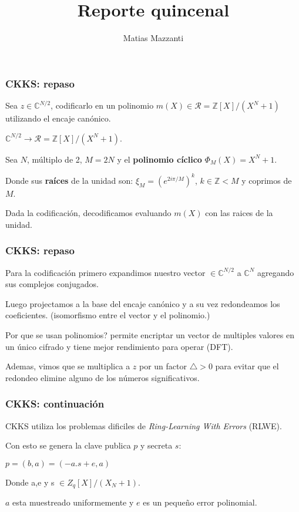 \documentclass[10pt]{beamer}
\title[Reporte quincenal]{Reporte quincenal}
\author[Matias Mazzanti]{Matias Mazzanti}
\begin{document}

\begin{frame}
\frametitle{CKKS: repaso}
Sea $z\in \mathbb{C}^{N/2}$, codificarlo en un polinomio  $m(X)\in \mathcal{R} = \mathbb{Z}[X]/(X^N+1)$
utilizando el encaje canónico.
\pause

$ \mathbb{C}^{N/2} \to \mathcal{R} =\mathbb{Z}[X]/(X^N+1)$.
\pause

Sea $N$, múltiplo de 2, $M=2N$ y el
 \textbf{polinomio cíclico} $\Phi_M(X)= X^N+1$.
\pause

Donde sus \textbf{raíces} de la unidad son: $\xi_M=(e^{2i\pi/M})^k$, $k\in \mathbb{Z}<M$ y coprimos de $M$.
\pause

Dada la codificación, decodificamos evaluando $m(X)$ con las raices de la unidad.

\end{frame}

\begin{frame}
\frametitle{CKKS: repaso}
Para la codificación primero expandimos nuestro vector $\in  \mathbb{C}^{N/2}$ a $ \mathbb{C}^{N}$
agregando sus complejos conjugados.
\pause

Luego projectamos a la base del encaje canónico y a su vez redondeamos los coeficientes.
(isomorfismo entre el vector y el polinomio.)
\pause

Por que se usan polinomios? \pause permite encriptar un vector de multiples valores en un único cifrado
y tiene mejor rendimiento para operar (DFT).

\pause
Ademas, vimos que se multiplica a $z$ por un factor $\bigtriangleup>0$  para evitar
que el redondeo elimine alguno de los números significativos.

\end{frame}

\begin{frame}
\frametitle{CKKS: continuación}
CKKS utiliza los problemas dificiles de \textit{Ring-Learning With Errors} (RLWE).
\pause

Con esto se genera la clave publica $p$ y secreta $s$:

$p = (b,a) = (-a.s+e,a)$

Donde a,e y s $\in Z_q[X]/(X_N+1)$.
\pause

$a$ esta muestreado uniformemente y $e$ es un pequeño error polinomial.
\pause

\end{frame}
\end{document}
